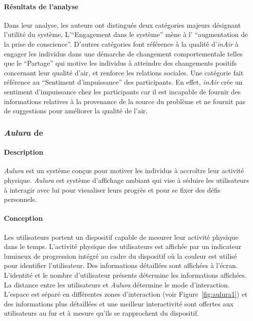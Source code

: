 \documentclass[10pt,a5paper,twoside]{article}
\begin{document}
\paragraph{Résultats de l'analyse}\label{ruxe9sultats-de-lanalyse}

Dans leur analyse, les auteurs ont distingués deux catégories majeurs
désignant l'utilité du système, L'``Engagement dans le système'' mène à
l' ``augmentation de la prise de conscience''. D'autres catégories font
référence à la qualité d'\emph{inAir} à engager les individus dans une
démarche de changement comportementale telles que le ``Partage'' qui
motive les individus à atteindre des changements positifs concernant
leur qualité d'air, et renforce les relations sociales. Une catégorie
fait référence au ``Sentiment d'impuissance'' des participants. En
effet, \emph{inAir} crée un sentiment d'impuissance chez les
participants car il est incapable de fournir des informations relatives
à la provenance de la source du problème et ne fournit pas de
suggestions pour améliorer la qualité de l'air.

\subsubsection{\emph{Aulura} de
\citet{faber2011aulura}}\label{aulura-de-faber2011aulura}

\paragraph{Description}\label{description-3}

\emph{Aulura} est un système conçus pour motiver les individus à
accroître leur activité physique. \emph{Aulura} est système d'affichage
ambiant qui vise à séduire les utilisateurs à interagir avec lui pour
visualiser leurs progrès et pour se fixer des défis personnels.

\paragraph{Conception}\label{conception-3}

Les utilisateurs portent un dispositif capable de mesurer leur activité
physique dans le temps. L'activité physique des utilisateurs est
affichée par un indicateur lumineux de progression intégré au cadre du
dispositif où la couleur est utilisé pour identifier l'utilisateur. Des
informations détaillées sont affichées à l'écran. L'identité et le
nombre d'utilisateur présents détermine les informations affichées. La
distance entre les utilisateurs et \emph{Aulura} détermine le mode
d'interaction. L'espace est séparé en différentes zones d'interaction
(voir Figure~\ref{fig:aulura1}) et des informations plus détaillées et
une meilleur interactivité sont offertes aux utilisateurs au fur et à
mesure qu'ils se rapprochent du dispositif.
\end{document}
